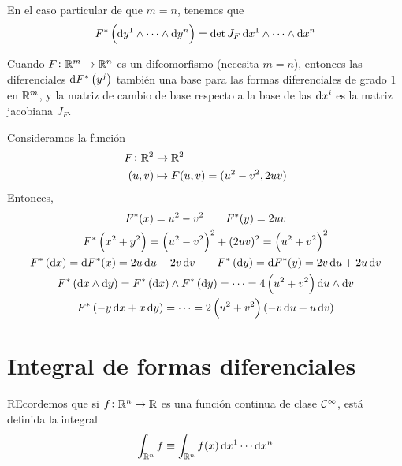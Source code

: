 \begin{obs}
    En el caso particular de que $m=n$, tenemos que
    \[
        F^\ast \left( \dif y^1 \wedge \cdots \wedge \dif y^n \right) = \det J_F \dif x^1 \wedge \cdots \wedge \dif x^n
    \]
\end{obs}

\begin{prop}
    Cuando $F \colon \mathbb{R}^m \to \mathbb{R}^n$ es un difeomorfismo (necesita $m=n$), entonces las diferenciales $\dif F^\ast \left( y^j \right)$
    tambi\'en una base para las formas diferenciales de grado 1 en $\mathbb{R}^m$, y la matriz de cambio de base respecto a la base de las
    $\dif x^i$ es la matriz jacobiana $J_F$.
\end{prop}

\begin{example*}
    Consideramos la función
    \[
        \begin{aligned}
            F \colon \mathbb{R}^2 &\to \mathbb{R}^2 \\
            (u,v) &\mapsto F(u,v) = (u^2 - v^2, 2uv)
        \end{aligned}
    \]
    Entonces,
    \begin{gather*}
        F^\ast(x) = u^2 - v^2 \qquad F^\ast(y) = 2uv \\
        F^\ast \left( x^2 + y^2 \right) = \left(u^2 - v^2\right)^2 + (2uv)^2 = \left(u^2 +v^2\right)^2 \\
        F^\ast\left( \dif x \right) = \dif F^\ast(x) = 2u\dif u - 2v\dif v
        \qquad
        F^\ast\left( \dif y \right) = \dif F^\ast (y) = 2v \dif u + 2u \dif v \\
        F^\ast\left( \dif x \wedge \dif y \right) = F^\ast\left( \dif x \right) \wedge F^\ast\left( \dif y \right) = \cdots =
        4 \left( u^2 + v^2 \right) \dif u \wedge \dif v \\
        F^\ast\left( -y\dif x + x \dif y\right) = \cdots = 2 \left( u^2 + v^2 \right) \left( -v \dif u + u \dif v \right)
    \end{gather*}
\end{example*}

\section{Integral de formas diferenciales}

\begin{obs}
    REcordemos que si $f \colon \mathbb{R}^n \to \mathbb{R}$ es una función continua de clase $\mathcal{C}^\infty$, está definida la integral
    \[
        \int_{\real^n} f \equiv \int_{\real^n} f(x) \dif x^1 \cdots \dif x^n
    \]
\end{obs}

